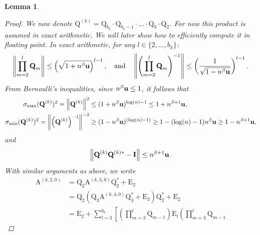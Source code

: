 \documentclass{article}
\newcommand{\lnorm}{\left\|}
\newcommand{\rnorm}{\right\|}
\newcommand{\lbrac}{\left[}
\newcommand{\lpar}{\left(}
\newcommand{\rpar}{\right)}
\newtheorem{lemma}{Lemma}[section]
\newcommand\matA{\boldsymbol{\mathrm{A}}}
\newcommand\matE{\boldsymbol{\mathrm{E}}}
\newcommand\matI{\boldsymbol{\mathrm{I}}}
\newcommand\matQ{\boldsymbol{\mathrm{Q}}}
\newcommand{\umach}{\textbf{\textup{u}}}
\newcommand{\cmm}{\beta}
\begin{document}
\begin{lemma}
\begin{proof}
        We now denote $\matQ^{(k)}=\matQ_{b_k}\cdot\matQ_{b_k-1}\cdot\ldots\cdot\matQ_3\cdot\matQ_2$. For now this product is assumed in exact arithmetic. We will later show how to efficiently compute it in floating point. 
        In exact arithmetic, for any $l\in\{2,\ldots,b_k\}$:
        \begin{align*}
            \lnorm
                \prod_{m=2}^{l}\matQ_{m}
            \rnorm
            \leq
            \lpar \sqrt{1+n^{\cmm}\umach}\rpar^{l-1},
            \quad
            \text{and}
            \quad
            \lnorm
                \lpar
                \prod_{m=2}^{l}\matQ_{m}
                \rpar^{-1}
            \rnorm
            \leq
            \lpar \frac{1}{\sqrt{1-n^{\cmm}\umach}}\rpar^{l-1}.
        \end{align*}
        From Bernoulli's inequalities, since $n^{\cmm}\umach\leq 1$, it follows that 
        \begin{align*}
            \sigma_{\max}(\matQ^{(k)})^2
            =
            \lnorm \matQ^{(k)} \rnorm^2 &\leq (1+n^{\cmm}\umach)^{\log(n)-1} \leq 1+n^{\cmm+1}\umach,
            \\
            \sigma_{\min}(\matQ^{(k)})^2
            =
            \lnorm 
                \lpar\matQ^{(k)}\rpar^{-1} 
            \rnorm^{-2} 
            &\geq (1-n^{\cmm}\umach)^{(\log(n)-1)} 
            \geq 1-(\log(n)-1)n^{\cmm}\umach
            \geq 1-n^{\cmm+1}\umach,
        \end{align*}
        and
        \begin{align}
            \label{eq:lemma_bandwidth_halving_q_approximately_orthogonal}
            \lnorm \matQ^{(k)}\matQ^{(k)*}-\matI \rnorm \leq n^{\cmm+1}\umach.
        \end{align}
        With similar arguments as above, we write
        \begin{align*}
            \matA^{(k,2,0)}
            &=
            \matQ_2\matA^{(k,3,0)}\matQ_2^* + \matE_2
            \\
            &=
            \matQ_2\lpar
                \matQ_3\matA^{(k,4,0)}\matQ_3^*+\matE_3
            \rpar
            \matQ_2^*
            +\matE_2
            \\
            &=
            \matE_2
            +
            \sum_{l=3}^{b_k}
            \lbrac
                \lpar
                \prod_{m=3}^l
                    \matQ_{m-1}
                \rpar
                \matE_l
                \lpar
                \prod_{m=3}^l
                    \matQ_{m-1}

\end{align*}
\end{proof}
\end{lemma}
\end{document}
